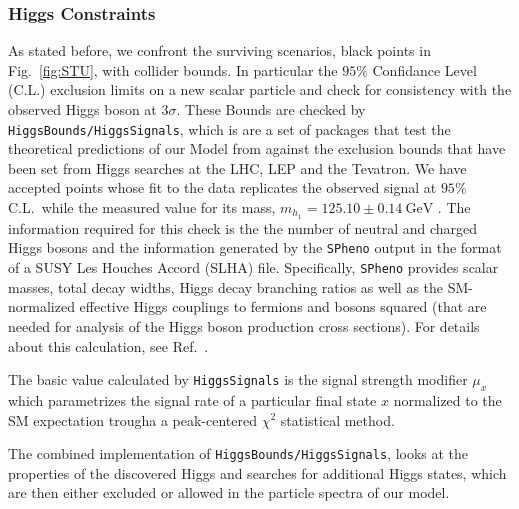 
\subsubsection{Higgs Constraints}

As stated before, we confront the surviving scenarios, black points in Fig.~\ref{fig:STU}, with collider bounds. 
%
In particular the $95\%$ Confidance Level (C.L.) exclusion limits on a new scalar particle and check for consistency with the observed Higgs boson at $3 \sigma$. 
%
These Bounds are checked by \texttt{HiggsBounds/HiggsSignals},  which  is are a set of packages that test the theoretical predictions of our Model from against the exclusion bounds that have been set from Higgs searches at the LHC, LEP and the Tevatron. 
%
We have accepted points whose fit to the data replicates the observed signal at $95\%$ C.L.~while the measured value for its mass, $m_{h_1} = 125.10 \pm 0.14~\textrm{GeV}$ \cite{Tanabashi:2018oca}. 
%
The information required for this check is the the number of neutral and charged Higgs bosons and the information generated by the \texttt{SPheno} output in the format of a SUSY Les Houches Accord (SLHA) \cite{Skands:2003cj} file.
%
Specifically, \texttt{SPheno} provides scalar masses, total decay widths, Higgs decay branching ratios as well as the SM-normalized effective Higgs couplings to fermions and bosons squared (that are needed for analysis of the Higgs boson production cross sections). 
%
For details about this calculation, see Ref.~\cite{Bechtle:2013wla}.

The basic value calculated by \texttt{HiggsSignals} is the signal strength modifier $\mu_{x}$ which parametrizes the signal rate of a particular final state $x$ normalized to the SM expectation trougha a peak-centered $\chi^2$ statistical method.

The combined implementation of \texttt{HiggsBounds/HiggsSignals}, looks at the properties of the discovered Higgs and searches for additional Higgs states, which are then either excluded or allowed in the particle spectra of our model. 

